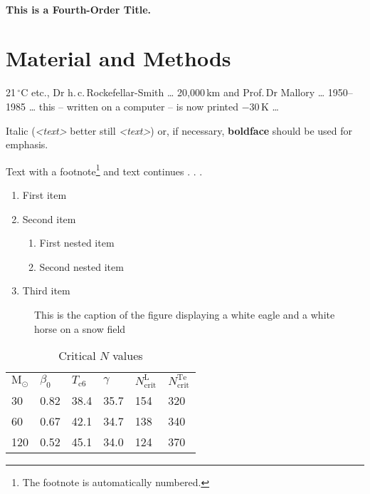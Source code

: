 \documentclass{llncs}
\begin{document}
\paragraph{This is a Fourth-Order Title.}

\section{Material and Methods}
21\,$^{\circ}$C etc.,
Dr h.\,c.\,Rockefellar-Smith \dots
20,000\,km and Prof.\,Dr Mallory \dots
1950--1985 \dots
this -- written on a computer -- is now printed
$-30$\,K \dots

Italic ({\em <text>} better still \emph{<text>}) or, if necessary, {\bfseries boldface} should be used for emphasis.

Text with a footnote\footnote{The footnote is automatically numbered.} and text continues . . .

\begin{enumerate}
	\item First item
	\item Second item
	\begin{enumerate}
		\item First nested item
		\item Second nested item
	\end{enumerate}
	\item Third item
\end{enumerate}


\begin{figure}
	\vspace{2.5cm}
	\caption{This is the caption of the figure displaying a white
eagle and a white horse on a snow field}
\end{figure}

\begin{table}
	\caption{Critical $N$ values}
	\begin{center}
		\begin{tabular}{llllll}
			\hline\noalign{\smallskip}
			${\mathrm M}_\odot$ & $\beta_{0}$ & $T_{\mathrm c6}$ & $\gamma$
			& $N_{\mathrm{crit}}^{\mathrm L}$
			& $N_{\mathrm{crit}}^{\mathrm{Te}}$\\
			\noalign{\smallskip}
			\hline
			\noalign{\smallskip}
			30 & 0.82 & 38.4 & 35.7 & 154 & 320 \\
			60 & 0.67 & 42.1 & 34.7 & 138 & 340 \\
			120 & 0.52 & 45.1 & 34.0 & 124 & 370 \\
			\hline
		\end{tabular}
	\end{center}
\end{table}
\end{document}
